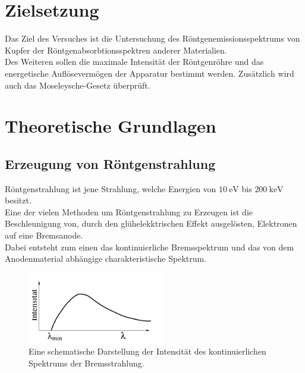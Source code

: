 \newpage
\section{Zielsetzung}
    Das Ziel des Versuches ist die Untersuchung des Röntgenemissionsspektrums  von Kupfer der
    Röntgenabsorbtionsspektren anderer Materialien.\\ Des Weiteren sollen die maximale Intensität der Röntgenröhre und das energetische Auflösevermögen der Apparatur bestimmt werden.
    Zusätzlich wird auch das Moseleysche-Gesetz überprüft.

\section{Theoretische Grundlagen }

\subsection{Erzeugung von Röntgenstrahlung}

Röntgenstrahlung ist jene Strahlung, welche Energien von $\SI{10}{\eV}$ bis $\SI{200}{\kilo\eV}$ besitzt.\\
Eine der vielen Methoden um Röntgenstrahlung zu Erzeugen ist die Beschleunigung von, durch den glühelekktrischen Effekt ausgelösten, Elektronen auf eine Bremsanode.\\
Dabei entsteht zum einen das kontinuierliche Bremsspektrum und das  von dem Anodenmaterial abhängige charakteristische Spektrum.\\
\begin{figure}
    \centering
    \includegraphics[width=6cm]{latex/images/kurve1.PNG}
    \caption{Eine schematische Darstellung der Intensität des kontinuierlichen Spektrums der Bremsstrahlung\protect \cite{V602}.}
    \label{img:kont}
\end{figure}

